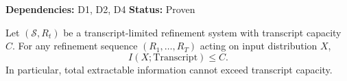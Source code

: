 \begin{lemma}
\textbf{Dependencies: } D1, D2, D4
\textbf{Status: } Proven

Let $(\mathcal S, R_t)$ be a transcript-limited refinement system with transcript capacity $C$.
For any refinement sequence $(R_1,\dots,R_T)$ acting on input distribution $X$,
\[
I(X;\mathrm{Transcript}) \leq C.
\]
In particular, total extractable information cannot exceed transcript capacity.
\end{lemma}

